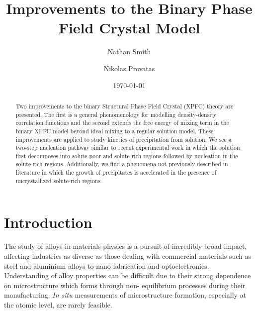 \documentclass[showkeys, prb, reprint]{revtex4-1}
\begin{document}

\title{Improvements to the  Binary Phase Field Crystal Model}
\author{Nathan Smith}
\author{Nikolas Provatas}
\date{\today}

\begin{abstract}

Two improvements to the binary Structural Phase Field Crystal (XPFC) theory are
presented. The first is a general phenomenology for modelling density-density
correlation functions and the second extends the free energy of mixing term in
the binary XPFC model beyond ideal mixing to a regular solution model. These
improvements are applied to study kinetics of precipitation from solution. We
see a two-step nucleation pathway similar to recent experimental work
\cite{LOH17, WALLACE13} in which the solution first decomposes into solute-poor
and solute-rich regions followed by nucleation in the solute-rich regions.
Additionally, we find a phenomena not previously described in literature in
which the growth of precipitates is accelerated in the presence of
uncrystallized solute-rich regions.

\end{abstract}


\maketitle


\section{Introduction} %



The study of alloys in materials physics is a pursuit of incredibly broad
impact, affecting industries as diverse as those dealing with commercial
materials such as steel and aluminium alloys to nano-fabrication and
optoelectronics. Understanding of alloy properties can be difficult due to
their strong dependence on microstructure which forms through non- equilibrium
processes during their manufacturing. \textit{In situ} measurements of
microstructure formation, especially at the atomic level, are rarely feasible.
\end{document}
